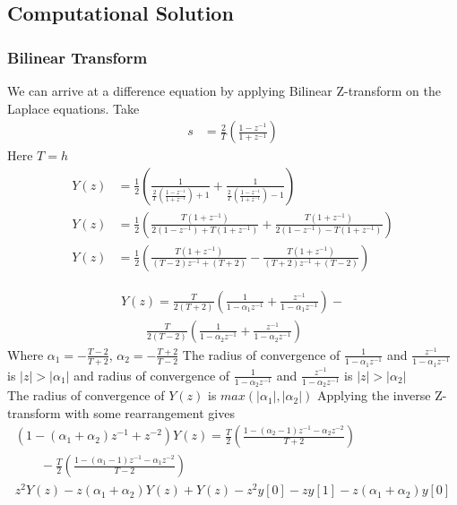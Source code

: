\documentclass{beamer}
\providecommand{\sbrak}[1]{\ensuremath{{}\left[#1\right]}}
\providecommand{\brak}[1]{\ensuremath{\left(#1\right)}}
\theoremstyle{remark}
\providecommand{\abs}[1]{\left\vert#1\right\vert}
\numberwithin{equation}{section}
\begin{document}
\subsection{Computational Solution}
\begin{frame}
\frametitle{Bilinear Transform}
We can arrive at a difference equation by applying Bilinear Z-transform on the Laplace equations. Take
\begin{align}
	s &= \frac{2}{T}\brak{\frac{1-z^{-1}}{1+z^{-1}}}
\end{align}
Here $T = h$
\begin{align}
	Y\brak{z} &= \frac{1}{2}\brak{\frac{1}{\frac{2}{T}\brak{\frac{1-z^{-1}}{1+z^{-1}}}+1}+\frac{1}{\frac{2}{T}\brak{\frac{1-z^{-1}}{1+z^{-1}}}-1}}\\
	Y\brak{z} &= \frac{1}{2}\brak{\frac{T\brak{1+z^{-1}}}{2\brak{1-z^{-1}}+T\brak{1+z^{-1}}}+\frac{T\brak{1+z^{-1}}}{2\brak{1-z^{-1}}-T\brak{1+z^{-1}}}}\\
	Y\brak{z} &= \frac{1}{2}\brak{\frac{T\brak{1+z^{-1}}}{\brak{T-2}z^{-1}+\brak{T+2}} - \frac{T\brak{1+z^{-1}}}{\brak{T+2}z^{-1}+\brak{T-2}}}
\end{align}
\end{frame}
\begin{frame}
\begin{align}
	Y\brak{z} = \frac{T}{2\brak{T+2}}\brak{\frac{1}{1-\alpha_1z^{-1}}+\frac{z^{-1}}{1-\alpha_1z^{-1}}}-\nonumber \\
  \qquad\frac{T}{2\brak{T-2}}\brak{\frac{1}{1-\alpha_2z^{-1}}+\frac{z^{-1}}{1-\alpha_2z^{-1}}}
\end{align}
Where $\alpha_1 = -\frac{T-2}{T+2}$, $\alpha_2 = -\frac{T+2}{T-2}$\newline
The radius of convergence of $\frac{1}{1-\alpha_1z^{-1}}$ and $\frac{z^{-1}}{1-\alpha_1z^{-1}}$ is $\abs{z}>\abs{\alpha_1}$ and radius of convergence of $\frac{1}{1-\alpha_2z^{-1}}$ and $\frac{z^{-1}}{1-\alpha_2z^{-1}}$ is $\abs{z}>\abs{\alpha_2}$\\
The radius of convergence of $Y\brak{z}$ is $max\brak{\abs{\alpha_1},\abs{\alpha_2}}$\newline
Applying the inverse Z-transform with some rearrangement gives
\begin{align}
	\brak{1-\brak{\alpha_1+\alpha_2}z^{-1}+z^{-2}}Y\brak{z} = \frac{T}{2}\brak{\frac{1-\brak{\alpha_2-1}z^{-1}-\alpha_2z^{-2}}{T+2}}\nonumber \\
  \qquad -\frac{T}{2}\brak{\frac{1-\brak{\alpha_1-1}z^{-1}-\alpha_1z^{-2}}{T-2}}\\
	z^2Y\brak{z}-z\brak{\alpha_1+\alpha_2}Y\brak{z}+Y\brak{z} -z^2y\sbrak{0} -zy\sbrak{1} -z\brak{\alpha_1+\alpha_2}y\sbrak{0}\nonumber
\end{align}
\end{frame}
\end{document}
